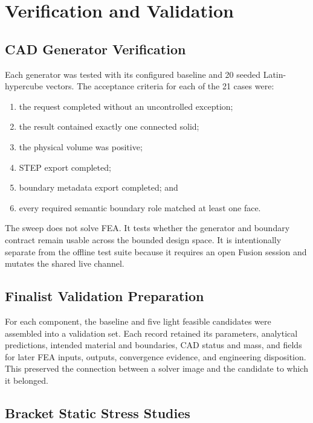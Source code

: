 \section{Verification and Validation}
\label{sec:verification-validation-method}

\subsection{CAD Generator Verification}
\label{sec:cad-sweep-method}

Each generator was tested with its configured baseline and 20 seeded
Latin-hypercube vectors. The acceptance criteria for each of the 21 cases were:

\begin{enumerate}
    \item the request completed without an uncontrolled exception;
    \item the result contained exactly one connected solid;
    \item the physical volume was positive;
    \item STEP export completed;
    \item boundary metadata export completed; and
    \item every required semantic boundary role matched at least one face.
\end{enumerate}

The sweep does not solve FEA. It tests whether the generator and boundary
contract remain usable across the bounded design space. It is intentionally
separate from the offline test suite because it requires an open Fusion
session and mutates the shared live channel.

\subsection{Finalist Validation Preparation}
\label{sec:validation-package-method}

For each component, the baseline and five light feasible candidates were
assembled into a validation set. Each record retained its parameters,
analytical predictions, intended material and boundaries, CAD status and mass,
and fields for later FEA inputs, outputs, convergence evidence, and engineering
disposition. This preserved the connection between a solver image and the
candidate to which it belonged.

\subsection{Bracket Static Stress Studies}
\label{sec:bracket-poc-method}


